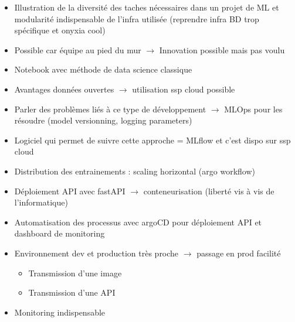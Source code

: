 \begin{itemize}
    \item Illustration de la diversité des taches nécessaires dans un projet de ML et modularité indispensable de l'infra utilisée (reprendre infra BD trop spécifique et onyxia cool)
    \item Possible car équipe au pied du mur $\rightarrow$ Innovation possible mais pas voulu
    \item Notebook avec méthode de data science classique
    \item Avantages données ouvertes $\rightarrow$ utilisation ssp cloud possible
    \item Parler des problèmes liés à ce type de développement $\rightarrow$ MLOps pour les résoudre (model versionning, logging parameters)
    \item Logiciel qui permet de suivre cette approche = MLflow et c'est dispo sur ssp cloud
    \item Distribution des entrainements : scaling horizontal (argo workflow)
    \item Déploiement API avec fastAPI $\rightarrow$ conteneurisation (liberté vis à vis de l'informatique)
    \item Automatisation des processus avec argoCD pour déploiement API et dashboard de monitoring
    \item Environnement dev et production très proche $\rightarrow$ passage en prod facilité
    \begin{itemize}
        \item Transmission d'une image
        \item Transmission d'une API
    \end{itemize}
    \item Monitoring indispensable
\end{itemize}